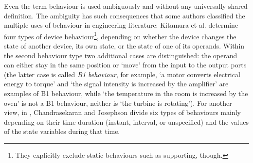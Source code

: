 \documentclass[sw]{iosart2x}
\newcommand{\firstTimeKeyWord}[1]{\textit{#1}}
\newcommand{\quotes}[1]{`#1'}
\newcommand{\TODO}[1]{{%
}}
\newcommand{\myComment}[1]{{\unskip \ignorespaces}}
\begin{document}
Even the term behaviour is used ambiguously and without any universally shared definition. 
The ambiguity has such consequences that some authors classified the multiple uses of behaviour in engineering literature: 
Kitamura et al. \cite{kitamuraOntologyBasedFunctionalKnowledgeModeling2004} determine four types of device behaviour\footnote{They explicitly exclude static behaviours such as supporting, though.}, depending on whether the device changes the state of another device, its own state, or the state of one of its operands. Within the second behaviour type two additional cases are distinguished: the operand can either stay in the same position or `move' from the input to the output ports (the latter case is called \firstTimeKeyWord{B1 behaviour}, for example, \quotes{a motor converts electrical energy to torque} and \quotes{the signal intensity is increased by the amplifier} are examples of B1 behaviour, while \quotes{the temperature in the room is increased by the oven} is not a B1 behaviour, neither is \quotes{the turbine is rotating}).
\myComment{Instead} For another view, in \cite{chandrasekaranFunctionDeviceRepresentation2000}, Chandrasekaran and Josephson divide six types of behaviours mainly depending on their time duration (instant, interval, or unspecified) and the values of the state variables during that time.

\end{document}
